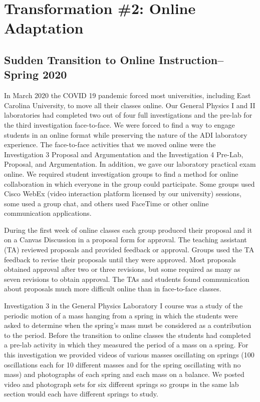 \documentclass[aip, preprint, numerical]{revtex4-2}
\begin{document}
\setcounter{section}{3}
\section{Transformation \#2: Online Adaptation}

\subsection{Sudden Transition to Online Instruction--Spring 2020}

In March 2020 the COVID 19 pandemic forced most universities, including East Carolina University, to move all their classes online. Our General Physics I and II laboratories had completed two out of four full investigations and the pre-lab for the third investigation face-to-face. We were forced to find a way to engage students in an online format while preserving the nature of the ADI laboratory experience. The face-to-face activities that we moved online were the Investigation 3 Proposal and Argumentation and the Investigation 4 Pre-Lab, Proposal, and Argumentation. In addition, we gave our laboratory practical exam online. We required student investigation groups to find a method for online collaboration in which everyone in the group could participate. Some groups used Cisco WebEx (video interaction platform licensed by our university) sessions, some used a group chat, and others used FaceTime or other online communication applications. 

During the first week of online classes each group produced their proposal and it on a Canvas Discussion in a proposal form for approval. The teaching assistant (TA) reviewed proposals and provided feedback or approval. Groups used the TA feedback to revise their proposals until they were approved. Most proposals obtained approval after two or three revisions, but some required as many as seven revisions to obtain approval. The TAs and students found communication about proposals much more difficult online than in face-to-face classes. 

Investigation 3 in the General Physics Laboratory I course was a study of the periodic motion of a mass hanging from a spring in which the students were asked to determine when the spring's mass must be considered as a contribution to the period. Before the transition to online classes the students had completed a pre-lab activity in which they measured the period of a mass on a spring. For this investigation we provided videos of various masses oscillating on springs (100 oscillations each for 10 different masses and for the spring oscillating with no mass) and photographs of each spring and each mass on a balance. We posted video and photograph sets for six different springs so groups in the same lab section would each have different springs to study. 
\end{document}
